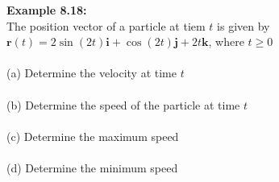 \documentclass[10pt,a4paper]{article}
\newcommand{\dotline}{\noindent\makebox[\linewidth]{\dotfill}\\[1em]}
\begin{document}
\textbf{\textcolor{OliveGreen}{Example 8.18}:}\\
The position vector of a particle at tiem $t$ is given by $\boldsymbol{r}(t) = 2\sin(2t)\boldsymbol{i}+\cos(2t)\boldsymbol{j}+2t\boldsymbol{k}$, where $t\geq 0$\\
\\
(a) Determine the velocity at time $t$\\
\\
(b) Determine the speed of the particle at time $t$\\
\\
(c) Determine the maximum speed\\
\\
(d) Determine the minimum speed\\

\dotline
\dotline
\dotline
\dotline
\dotline
\dotline
\dotline
\dotline
\dotline
\dotline
\dotline
\dotline
\dotline
\dotline
\dotline
\dotline
\dotline
\dotline
\dotline
\dotline
\dotline
\dotline
\dotline
\end{document}
